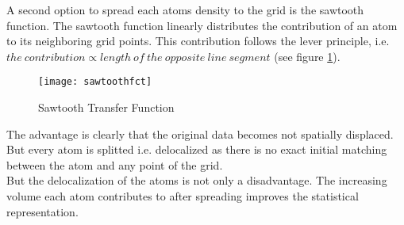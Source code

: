 A second option to spread each atoms density to the grid is the sawtooth function.
The sawtooth function linearly distributes the contribution of an atom to its neighboring grid points. This contribution follows the lever principle, i.e. $ the \: contribution \propto length \: of \: the \: opposite \: line \: segment $ (see figure \ref{fig:sawtoothfunction}).

\begin{figure}[H]
	\centering
	\texttt{[image: sawtoothfct]}
	\caption{Sawtooth Transfer Function \label{fig:sawtoothfunction}}
\end{figure}

The advantage is clearly that the original data becomes  not spatially displaced.
But every atom is splitted i.e. delocalized as there is no exact initial matching between the atom and any point of the grid.\\

But the delocalization of the atoms is not only a disadvantage. The increasing volume each atom contributes to after spreading improves the statistical representation.\\

